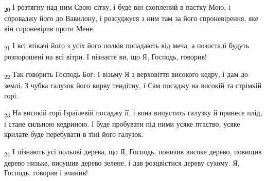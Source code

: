 \begin{tcolorbox}
\textsubscript{20} І розтягну над ним Свою сітку, і буде він схоплений в пастку Мою, і спроваджу його до Вавилону, і розсуджуся з ним там за його спроневірення, яке він спроневірив проти Мене.
\end{tcolorbox}
\begin{tcolorbox}
\textsubscript{21} І всі втікачі його з усіх його полків попадають від меча, а позосталі будуть розпорошені на всі вітри. І пізнаєте ви, що Я, Господь, говорив!
\end{tcolorbox}
\begin{tcolorbox}
\textsubscript{22} Так говорить Господь Бог: І візьму Я з верховіття високого кедру, і дам до землі. З чубка галузок його вирву тендітну, і Сам посаджу на високій та стрімкій горі.
\end{tcolorbox}
\begin{tcolorbox}
\textsubscript{23} На високій горі Ізраїлевій посаджу її, і вона випустить галузку й принесе плід, і стане сильною кедриною. І буде пробувати під ними усяке птаство, усяке крилате буде перебувати в тіні його галузок.
\end{tcolorbox}
\begin{tcolorbox}
\textsubscript{24} І пізнають усі польові дерева, що Я, Господь, понизив високе дерево, повищив дерево низьке, висушив дерево зелене, і дав розцвістися дереву сухому. Я, Господь, говорив і вчинив!
\end{tcolorbox}
